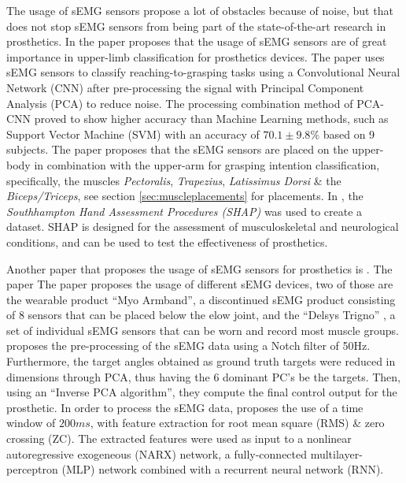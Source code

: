 \documentclass[../main.tex]{subfiles}
\begin{document}
The usage of sEMG sensors propose a lot of obstacles because of noise, but that does not stop sEMG sensors from being part of the state-of-the-art research in prosthetics.
In the paper \cite{KeunTaeKim2021} proposes that the usage of sEMG sensors are of great importance in upper-limb classification for prosthetics devices.
The paper uses sEMG sensors to classify reaching-to-grasping tasks using  a Convolutional Neural Network (CNN) after pre-processing the signal with Principal Component Analysis (PCA) to reduce noise.
The processing combination method of PCA-CNN proved to show higher accuracy than Machine Learning methods, such as Support Vector Machine (SVM) with an accuracy of $70.1 \pm 9.8\%$ based on 9 subjects.
The paper proposes that the sEMG sensors are placed on the upper-body in combination with the upper-arm for grasping intention classification, specifically, the muscles \textit{Pectoralis}, \textit{Trapezius}, \textit{Latissimus Dorsi} \& the \textit{Biceps/Triceps}, see section \ref{sec:muscleplacements} for placements.
In \cite{KeunTaeKim2021}, the \textit{Southhampton Hand Assessment Procedures (SHAP)} \cite{shap} was used to create a dataset.
SHAP is designed for the assessment of musculoskeletal and neurological conditions, and can be used to test the effectiveness of prosthetics.

Another paper that proposes the usage of sEMG sensors for prosthetics is \cite{Zhaolong2021}.
The paper
The paper proposes the usage of different sEMG devices, two of those are the wearable product ``Myo Armband'', \cite{myo} a discontinued sEMG product consisting of 8 sensors that can be placed below the elow joint, and the ``Delsys Trigno'' \cite{trigno}, a set of individual sEMG sensors that can be worn and record most muscle groups.
\cite{Zhaolong2021} proposes the pre-processing of the sEMG data using a Notch filter of 50Hz.
Furthermore, the target angles obtained as ground truth targets were reduced in dimensions through PCA, thus having the 6 dominant PC's be the targets.
Then, using an ``Inverse PCA algorithm'', they compute the final control output for the prosthetic.
In order to process the sEMG data, \cite{Zhaolong2021} proposes the use of a time window of $200ms$, with feature extraction for root mean square (RMS) \& zero crossing (ZC).
The extracted features were used as input to a nonlinear autoregressive exogeneous (NARX) network, a fully-connected multilayer-perceptron (MLP) network combined with a recurrent neural network (RNN). 
\end{document}
